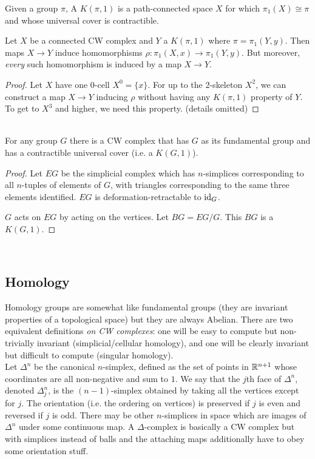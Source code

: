 \documentclass{amsart}
\begin{document}
	 Given a group $\pi$, A $K(\pi,1)$ is a path-connected space $X$ for which $\pi_1(X)\cong \pi$ and whose universal cover is contractible.
	 
	 Let $X$ be a connected CW complex and $Y$ a $K(\pi,1)$ where $\pi = \pi_1(Y,y)$. Then maps $X\to Y$ induce homomorphisms $\rho: \pi_1(X,x)\to \pi_1(Y,y)$. But moreover, \textit{every} such homomorphism is induced by a map $X\to Y$.
	 \begin{proof}
	 	Let $X$ have one $0$-cell $X^0=\{x\}$. For up to the 2-skeleton $X^2$, we can construct a map $X\to Y$ inducing $\rho$ without having any $K(\pi,1)$ property of $Y$. To get to $X^3$ and higher, we need this property. (details omitted)
	 \end{proof}\\
	 
	 For any group $G$ there is a CW complex that has $G$ as its fundamental group and has a contractible universal cover (i.e. a $K(G,1)$).
	 \begin{proof}
	 	Let $EG$ be the simplicial complex which has $n$-simplices corresponding to all $n$-tuples of elements of $G$, with triangles corresponding to the same three elements identified. $EG$ is deformation-retractable to $\operatorname{id}_G$.
	 	
	 	$G$ acts on $EG$ by acting on the vertices. Let $BG=EG/G$. This $BG$ is a $K(G,1)$.
	 \end{proof}\\
	 
	 \subsection{Homology} Homology groups are somewhat like fundamental groups (they are invariant properties of a topological space) but they are always Abelian. There are two equivalent definitions \textit{on CW complexes}: one will be easy to compute but non-trivially invariant (simplicial/cellular homology), and one will be clearly invariant but difficult to compute (singular homology).\\
	 
	 Let $\Delta^n$ be the canonical $n$-simplex, defined as the set of points in $\mathbb{R}^{n+1}$ whose coordinates are all non-negative and sum to $1$. We say that the $j$th face of $\Delta^n$, denoted $\Delta^n_j$, is the $(n-1)$-simplex obtained by taking all the vertices except for $j$. The orientation (i.e. the ordering on vertices) is preserved if $j$ is even and reversed if $j$ is odd. There may be other $n$-simplices in space which are images of $\Delta^n$ under some continuous map. A $\Delta$-complex is basically a CW complex but with simplices instead of balls and the attaching maps additionally have to obey some orientation stuff.\\
	 
\end{document}
